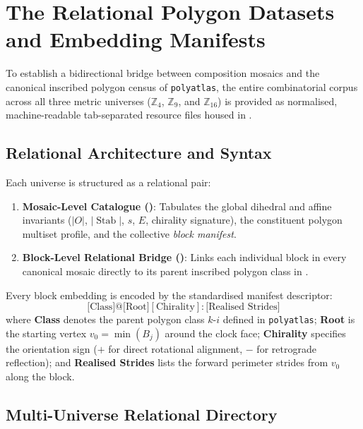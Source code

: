 \section{The Relational Polygon Datasets and Embedding Manifests}
\label{sec:hexdec-relational-datasets}

To establish a bidirectional bridge between composition mosaics and the canonical inscribed polygon census of \texttt{polyatlas}, the entire combinatorial corpus across all three metric universes ($\mathbb{Z}_4$, $\mathbb{Z}_9$, and $\mathbb{Z}_{16}$) is provided as normalised, machine-readable tab-separated resource files housed in .

\subsection{Relational Architecture and Syntax}

Each universe is structured as a relational pair:
\begin{enumerate}
    \item \textbf{Mosaic-Level Catalogue ()}:
    Tabulates the global dihedral and affine invariants ($|O|$, $|\operatorname{Stab}|$, $s$, $E$, chirality signature), the constituent polygon multiset profile, and the collective \emph{block manifest}.
    
    \item \textbf{Block-Level Relational Bridge ()}:
    Links each individual block in every canonical mosaic directly to its parent inscribed polygon class in .
\end{enumerate}

Every block embedding is encoded by the standardised manifest descriptor:
\begin{equation}
\label{eqn:hexdec-block-manifest}
\text{[Class]}@\text{[Root]}[\text{Chirality}]:\text{[Realised Strides]}
\end{equation}
where \textbf{Class} denotes the parent polygon class $k\text{-}i$ defined in \texttt{polyatlas}; \textbf{Root} is the starting vertex $v_0 = \min(B_j)$ around the clock face; \textbf{Chirality} specifies the orientation sign ($+$ for direct rotational alignment, $-$ for retrograde reflection); and \textbf{Realised Strides} lists the forward perimeter strides from $v_0$ along the block.

\subsection{Multi-Universe Relational Directory}

